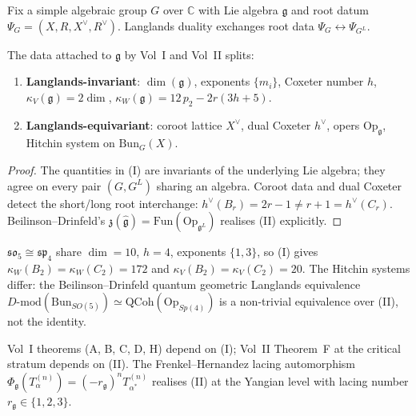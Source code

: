 \documentclass[11pt]{article}
\begin{document}
Fix a simple algebraic group $G$ over $\mathbb{C}$ with Lie algebra
$\mathfrak{g}$ and root datum $\Psi_G = (X, R, X^{\vee}, R^{\vee})$.
Langlands duality exchanges root data
$\Psi_G \leftrightarrow \Psi_{G^L}$.

\begin{theorem}
\label{thm:langlands-invariants-split}
The data attached to $\mathfrak{g}$ by Vol~I and Vol~II splits:
\begin{enumerate}
\item[(I)] \textbf{Langlands-invariant}: $\dim(\mathfrak{g})$,
exponents $\{m_i\}$, Coxeter number $h$,
$\kappa_V(\mathfrak{g}) = 2\dim$,
$\kappa_W(\mathfrak{g}) = 12\,p_2 - 2r(3h+5)$.
\item[(II)] \textbf{Langlands-equivariant}: coroot lattice $X^{\vee}$,
dual Coxeter $h^{\vee}$, opers $\mathrm{Op}_{\mathfrak{g}}$, Hitchin
system on $\mathrm{Bun}_G(X)$.
\end{enumerate}
\end{theorem}

\begin{proof}
The quantities in (I) are invariants of the underlying Lie algebra;
they agree on every pair $(G, G^L)$ sharing an algebra. Coroot data
and dual Coxeter detect the short/long root interchange:
$h^{\vee}(B_r) = 2r-1 \ne r+1 = h^{\vee}(C_r)$. Beilinson--Drinfeld's
$\mathfrak{z}(\widehat{\mathfrak{g}}) = \mathrm{Fun}(\mathrm{Op}_{\mathfrak{g}^L})$
realises (II) explicitly.
\end{proof}

\begin{example}
\label{ex:b2-c2-accident}
$\mathfrak{so}_5 \cong \mathfrak{sp}_4$ share $\dim = 10$, $h = 4$,
exponents $\{1, 3\}$, so (I) gives $\kappa_W(B_2) = \kappa_W(C_2)
= 172$ and $\kappa_V(B_2) = \kappa_V(C_2) = 20$. The Hitchin systems
differ: the Beilinson--Drinfeld quantum geometric Langlands
equivalence
$D\text{-}\mathrm{mod}(\mathrm{Bun}_{SO(5)}) \simeq
\mathrm{QCoh}(\mathrm{Op}_{Sp(4)})$
is a non-trivial equivalence over (II), not the identity.
\end{example}

\begin{corollary}
Vol~I theorems (A, B, C, D, H) depend on (I); Vol~II Theorem~F at
the critical stratum depends on (II). The Frenkel--Hernandez lacing
automorphism $\Phi_{\mathfrak{g}}(T^{(n)}_{\alpha}) =
(-r_{\mathfrak{g}})^n T^{(n)}_{\alpha^*}$ realises (II) at the
Yangian level with lacing number
$r_{\mathfrak{g}} \in \{1, 2, 3\}$.
\end{corollary}
\end{document}
